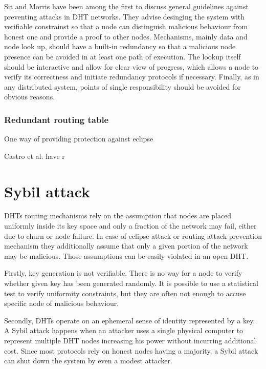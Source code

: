   Sit and Morris \cite{sit02} have been among the first to discuss general
  guidelines against preventing attacks in DHT networks. They advise desinging
  the system with verifiable constrainst so that a node can distinguish
  malicious behaviour from honest one and provide a proof to other nodes.
  Mechanisms, mainly data and node look up, should have a built-in redundancy so
  that a malicious node presence can be avoided in at least one path of
  execution. The lookup itself should be interactive and allow for clear view of
  progress, which allows a node to verify its correctness and initiate
  redundancy protocols if necessary. Finally, as in any distributed system,
  points of single responsibility should be avoided for obvious reasons.
  
  \subsubsection{Redundant routing table}
  One way of providing protection against eclipse
  
  Castro et al. \cite{urd11} have r


\section{Sybil attack}
  DHTs routing mechanisms rely on the assumption that nodes are placed uniformly
  inside its key space and only a fraction of the network may fail, either due
  to churn or node failure. In case of eclipse attack or routing attack
  prevention mechanism they additionally assume that only a given portion of the
  network may be malicious. Those assumptions can be easily violated in an open
  DHT.

  Firstly, key generation is not verifiable. There is no way for a node to
  verify whether given key has been generated randomly. It is possible to use a
  statistical test to verify uniformity constraints, but they are often not
  enough to accuse specific node of malicious behaviour.

  Secondly, DHTs operate on an ephemeral sense of identity represented by a key.
  A Sybil attack happens when an attacker uses a single physical computer to
  represent multiple DHT nodes increasing his power without incurring additional
  cost. Since most protocols rely on honest nodes having a majority, a Sybil
  attack can shut down the system by even a modest attacker.

